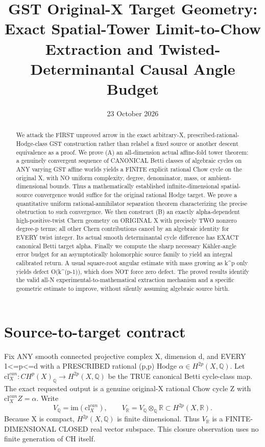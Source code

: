 \documentclass[11pt]{article}
\title{GST Original-X Target Geometry: Exact Spatial-Tower Limit-to-Chow Extraction and Twisted-Determinantal Causal Angle Budget}
\date{23 October 2026}
\begin{document}
\maketitle
\begin{abstract}
We attack the FIRST unproved arrow in the exact arbitrary-X,
prescribed-rational-Hodge-class GST construction rather than
relabel a fixed source or another descent equivalence as a proof.
We prove (A) an all-dimension actual affine-fold tower theorem:
a genuinely convergent sequence of CANONICAL Betti classes of
algebraic cycles on ANY varying GST affine worlds yields a
FINITE explicit rational Chow cycle on the original X,
with NO uniform complexity, degree, denominator, mass,
or ambient-dimensional bounds. Thus a mathematically
established infinite-dimensional spatial-source convergence
would suffice for the original rational Hodge target.
We prove a quantitative uniform rational-annihilator
separation theorem characterizing the precise obstruction
to such convergence. We then construct (B) an exactly
alpha-dependent high-positive-twist Chern geometry
on ORIGINAL X with precisely TWO nonzero
degree-p terms; all other Chern contributions cancel
by an algebraic identity for EVERY twist integer.
Its actual smooth determinantal cycle difference
has EXACT canonical Betti target alpha.
Finally we compute the sharp necessary Kähler-angle
error budget for an asymptotically holomorphic
source family to yield an integral calibrated return.
A usual square-root angular estimate with mass
growing as k^p only yields defect O(k^(p-1)),
which does NOT force zero defect.
The proved results identify the valid all-N
experimental-to-mathematical extraction mechanism
and a specific geometric estimate to improve,
without silently assuming algebraic source birth.
\end{abstract}

\section{Source-to-target contract}
Fix ANY smooth connected projective complex X,
dimension d, and EVERY 1<=p<=d with a
PRESCRIBED rational (p,p) Hodge
$\alpha\in H^{2p}(X,\mathbb Q)$.
Let $\mathrm{cl}^{can}_X:CH^p(X)_\mathbb Q
\to H^{2p}(X,\mathbb Q)$ be the
TRUE canonical Betti cycle-class map.
The exact requested output is a genuine
original-X rational Chow cycle Z with
$\mathrm{cl}^{can}_X Z=\alpha$.
Write
\[
 V_\mathbb Q=\mathrm{im}(\mathrm{cl}^{can}_X),
 \qquad V_\mathbb R=V_\mathbb Q\otimes_\mathbb Q\mathbb R
  \subset H^{2p}(X,\mathbb R).                    \tag{1}
\]
Because X is compact, $H^{2p}(X,\mathbb Q)$
is finite dimensional. Thus
$V_\mathbb R$ is a FINITE-DIMENSIONAL
CLOSED real vector subspace.
This closure observation uses no
finite generation of CH itself.
\end{document}

